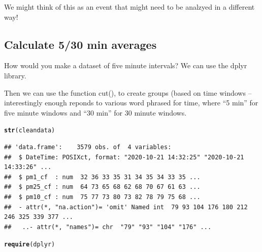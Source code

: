 \documentclass{article}\usepackage[]{graphicx}\usepackage[]{color}
\makeatletter
\newcommand{\hlstd}[1]{\textcolor[rgb]{0.345,0.345,0.345}{#1}}%
\newcommand{\hlkwd}[1]{\textcolor[rgb]{0.737,0.353,0.396}{\textbf{#1}}}%
\newenvironment{kframe}{%
 \def\at@end@of@kframe{}%
 \ifinner\ifhmode%
  \def\at@end@of@kframe{\end{minipage}}%
  \begin{minipage}{\columnwidth}%
 \fi\fi%
 \def\FrameCommand##1{\hskip\@totalleftmargin \hskip-\fboxsep
 \colorbox{shadecolor}{##1}\hskip-\fboxsep
     \hskip-\linewidth \hskip-\@totalleftmargin \hskip\columnwidth}%
 \MakeFramed {\advance\hsize-\width
   \@totalleftmargin\z@ \linewidth\hsize
   \@setminipage}}%
 {\par\unskip\endMakeFramed%
 \at@end@of@kframe}
\newenvironment{knitrout}{}{} %
\makeatother
\begin{document}
We might think of this as an event that might need to be analzyed in a different way!  

\subsection{Calculate 5/30 min averages}

How would you make a dataset of five minute intervals? We can use the dplyr library. 

Then we can use the function cut(), to create groups (based on time windows -- interestingly enough reponds to various word phrased for time, where ``5 min'' for five minute windows and ``30 min'' for 30 minute windows. 

\begin{knitrout}
\color{fgcolor}\begin{kframe}
\begin{alltt}
\hlkwd{str}\hlstd{(cleandata)}
\end{alltt}
\begin{verbatim}
## 'data.frame':	3579 obs. of  4 variables:
##  $ DateTime: POSIXct, format: "2020-10-21 14:32:25" "2020-10-21 14:33:26" ...
##  $ pm1_cf  : num  32 36 33 35 31 34 35 34 33 35 ...
##  $ pm25_cf : num  64 73 65 68 62 68 70 67 61 63 ...
##  $ pm10_cf : num  75 77 73 80 73 82 78 79 75 68 ...
##  - attr(*, "na.action")= 'omit' Named int  79 93 104 176 180 212 246 325 339 377 ...
##   ..- attr(*, "names")= chr  "79" "93" "104" "176" ...
\end{verbatim}
\begin{alltt}
\hlkwd{require}\hlstd{(dplyr)}
\end{alltt}


{\ttfamily\noindent\itshape\color{messagecolor}{\#\# Loading required package: dplyr}}

{\ttfamily\noindent\itshape\color{messagecolor}{\#\# \\\#\# Attaching package: 'dplyr'}}

{\ttfamily\noindent\itshape\color{messagecolor}{\#\# The following objects are masked from 'package:lubridate':\\\#\# \\\#\#\ \ \ \  intersect, setdiff, union}}

{\ttfamily\noindent\itshape\color{messagecolor}{\#\# The following objects are masked from 'package:stats':\\\#\# \\\#\#\ \ \ \  filter, lag}}


\end{kframe}
\end{knitrout}
\end{document}
